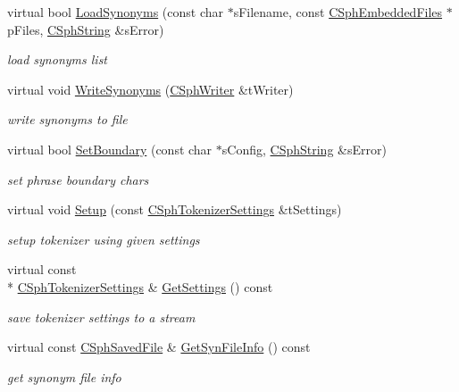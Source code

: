 \begin{DoxyCompactItemize}
virtual bool \hyperlink{classCSphTokenFilter_a16f6501d415cf6b2dfd12cb2ca8806fe}{Load\-Synonyms} (const char $\ast$s\-Filename, const \hyperlink{structCSphEmbeddedFiles}{C\-Sph\-Embedded\-Files} $\ast$p\-Files, \hyperlink{structCSphString}{C\-Sph\-String} \&s\-Error)
\begin{DoxyCompactList}\small\item\em load synonyms list \end{DoxyCompactList}\item 
virtual void \hyperlink{classCSphTokenFilter_a749f36fb97c0f06874f416c1c17bcad2}{Write\-Synonyms} (\hyperlink{classCSphWriter}{C\-Sph\-Writer} \&t\-Writer)
\begin{DoxyCompactList}\small\item\em write synonyms to file \end{DoxyCompactList}\item 
virtual bool \hyperlink{classCSphTokenFilter_aa378aaaa255c3292d06c4608abbd1c76}{Set\-Boundary} (const char $\ast$s\-Config, \hyperlink{structCSphString}{C\-Sph\-String} \&s\-Error)
\begin{DoxyCompactList}\small\item\em set phrase boundary chars \end{DoxyCompactList}\item 
virtual void \hyperlink{classCSphTokenFilter_aef717196a6eae7a912764201140aa9e5}{Setup} (const \hyperlink{structCSphTokenizerSettings}{C\-Sph\-Tokenizer\-Settings} \&t\-Settings)
\begin{DoxyCompactList}\small\item\em setup tokenizer using given settings \end{DoxyCompactList}\item 
virtual const \\*
\hyperlink{structCSphTokenizerSettings}{C\-Sph\-Tokenizer\-Settings} \& \hyperlink{classCSphTokenFilter_ad43fac69b8c8623e5f7d3507fb97e341}{Get\-Settings} () const 
\begin{DoxyCompactList}\small\item\em save tokenizer settings to a stream \end{DoxyCompactList}\item 
virtual const \hyperlink{structCSphSavedFile}{C\-Sph\-Saved\-File} \& \hyperlink{classCSphTokenFilter_a729f67b98f080ab45e2574877c775115}{Get\-Syn\-File\-Info} () const 
\begin{DoxyCompactList}\small\item\em get synonym file info \end{DoxyCompactList}\item 

\end{DoxyCompactItemize}
